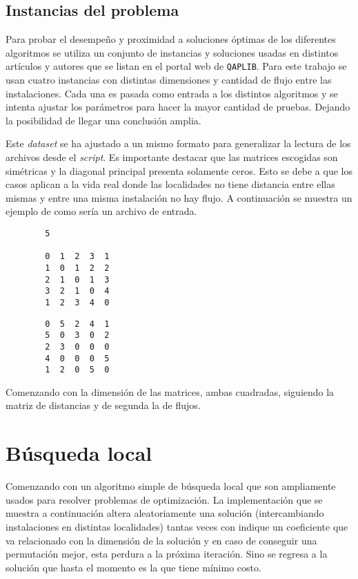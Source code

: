 \subsection*{Instancias del problema}

Para probar el desempeño y proximidad a soluciones óptimas de los diferentes algoritmos se utiliza un conjunto de instancias y soluciones usadas en distintos artículos y autores que se listan en el portal web de \texttt{QAPLIB}\cite{web:qaplib}. Para este trabajo se usan cuatro instancias con distintas dimensiones y cantidad de flujo entre las instalaciones. Cada una es pasada como entrada a los distintos algoritmos y se intenta ajustar los parámetros para hacer la mayor cantidad de pruebas. Dejando la posibilidad de llegar una conclusión amplia.

Este \textit{dataset} se ha ajustado a un mismo formato para generalizar la lectura de los archivos desde el \textit{script}. Es importante destacar que las matrices escogidas son simétricas y la diagonal principal presenta solamente ceros. Esto se debe a que los casos aplican a la vida real donde las localidades no tiene distancia entre ellas mismas y entre una misma instalación no hay flujo. A continuación se muestra un ejemplo de como sería un archivo de entrada.

\begin{lstlisting}
        5

        0  1  2  3  1
        1  0  1  2  2
        2  1  0  1  3
        3  2  1  0  4
        1  2  3  4  0
\end{lstlisting}

\newpage

\begin{lstlisting}
        0  5  2  4  1
        5  0  3  0  2
        2  3  0  0  0
        4  0  0  0  5
        1  2  0  5  0
\end{lstlisting}

Comenzando con la dimensión de las matrices, ambas cuadradas, siguiendo la matriz de distancias y de segunda la de flujos.

\section*{Búsqueda local}

Comenzando con un algoritmo simple de búsqueda local que son ampliamente usados para resolver problemas de optimización. La implementación que se muestra a continuación altera aleatoriamente una solución (intercambiando instalaciones en distintas localidades) tantas veces con indique un coeficiente que va relacionado con la dimensión de la solución y en caso de conseguir una permutación mejor, esta perdura a la próxima iteración. Sino se regresa a la solución que hasta el momento es la que tiene mínimo costo.

